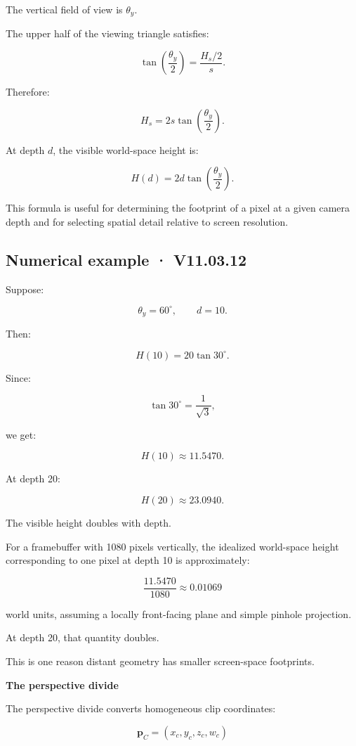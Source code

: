 The vertical field of view is \(\theta_y\).

The upper half of the viewing triangle satisfies:

\[
 \tan\left(\frac{\theta_y}{2}\right) = \frac{H_s/2}{s}.
\]

Therefore:

\[
 \boxed{ H_s=2s\tan\left(\frac{\theta_y}{2}\right) }.
\]

At depth \(d\), the visible world-space height is:

\[
 \boxed{ H(d)=2d\tan\left(\frac{\theta_y}{2}\right) }.
\]

This formula is useful for determining the footprint of a pixel at a given camera depth and for selecting spatial detail relative to screen resolution.

\subsection{Numerical example · V11.03.12}\label{02-foundations-ii-ch033-numerical-example-v11.03.12}

Suppose:

\[
 \theta_y=60^\circ, \qquad d=10.
\]

Then:

\[
 H(10)=20\tan30^\circ.
\]

Since:

\[
 \tan30^\circ=\frac1{\sqrt3},
\]

we get:

\[
 \boxed{ H(10)\approx11.5470 }.
\]

At depth 20:

\[
 H(20)\approx23.0940.
\]

The visible height doubles with depth.

For a framebuffer with 1080 pixels vertically, the idealized world-space height corresponding to one pixel at depth 10 is approximately:

\[
 \frac{11.5470}{1080}\approx0.01069
\]

world units, assuming a locally front-facing plane and simple pinhole projection.

At depth 20, that quantity doubles.

This is one reason distant geometry has smaller screen-space footprints.

\textbf{The perspective divide}

The perspective divide converts homogeneous clip coordinates:

\[
 \mathbf p_C= (x_c,y_c,z_c,w_c)
\]

